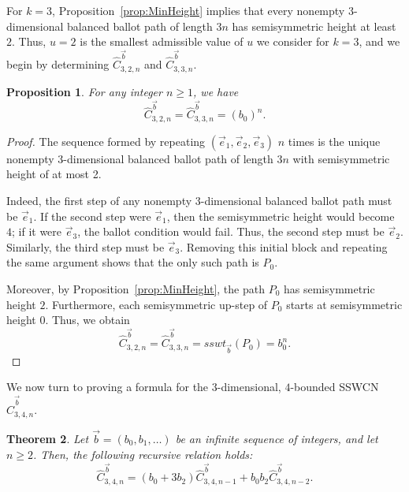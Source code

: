 \documentclass[11pt]{article}
\newtheorem{theorem}{Theorem}[section]
\newtheorem{proposition}[theorem]{Proposition}
\theoremstyle{remark}
\theoremstyle{definition}
\begin{document}
For $k=3$, Proposition~\ref{prop:MinHeight} implies that every nonempty $3$-dimensional balanced ballot path of length $3n$ has semisymmetric height at least $2$. Thus, $u=2$ is the smallest admissible value of $u$ we consider for $k=3$, and we begin by determining $\widehat{C}_{3, 2, n}^{\vec{b}}$ and $\widehat{C}_{3, 3, n}^{\vec{b}}$.
\begin{proposition}\label{prop:three}
    For any integer $n \geq 1$, we have \[\widehat{C}_{3,2,n}^{\vec b}=\widehat{C}_{3,3,n}^{\vec b}=(b_0)^n.\]
\end{proposition}
\begin{proof}
The sequence formed by repeating $(\vec e_1, \vec e_2, \vec e_3)$ $n$ times is the unique nonempty 3-dimensional balanced ballot path of length $3n$ with semisymmetric height of at most 2.

Indeed, the first step of any nonempty $3$-dimensional balanced ballot path must be $\vec {e} _ {1} $. If the second step were $\vec e_1$, then the semisymmetric height would become $4$; if it were $\vec e_3$, the ballot condition would fail. Thus, the second step must be $\vec {e} _2$. Similarly, the third step must be $\vec {e} _3$. Removing this initial block and repeating the same argument shows that the only such path is $P_0$.

Moreover, by Proposition~\ref{prop:MinHeight}, the path $P_0$ has semisymmetric height $2$. Furthermore, each semisymmetric up-step of $P_0$ starts at semisymmetric height $0$. Thus, we obtain 
\[
\widehat{C}_{3,2,n}^{\vec b}=\widehat{C}_{3,3,n}^{\vec b}=sswt_{\vec b}(P_0)=b_0^n.
\]\end{proof}
We now turn to proving a formula for the $3$-dimensional, $4$-bounded SSWCN $\widehat{C}_{3,4,n}^{\vec b}$.
\begin{theorem}
\label{thm:kboundedkdimensional}
    Let $\vec{b} = (b_0, b_1, \dots)$ be an infinite sequence of integers, and let $n \geq 2$. Then, the following recursive relation holds:
    \[\widehat{C}_{3, 4, n}^{\vec{b}} = (b_0+3b_2) \widehat{C}_{3, 4, n-1}^{\vec{b}} + b_0b_2\widehat{C}_{3, 4, n-2}^{\vec{b}}.\]
\end{theorem}
\end{document}
